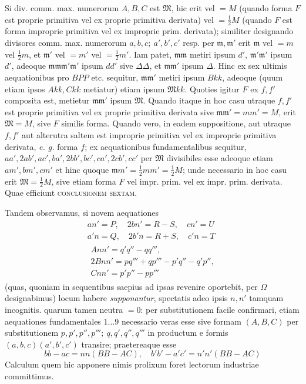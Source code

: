 Si div. comm. max. numerorum $A,B,C$ est $\mathfrak{M}$, hic erit vel $=M$ (quando forma $F$ est proprie primitiva vel ex proprie primitiva derivata) vel $=\frac{1}{2}M$ (quando $F$ est forma improprie primitiva vel ex improprie prim. derivata); similiter designando divisores comm. max. numerorum $a,b,c;\ a',b',c'$ resp. per $\mathfrak{m},\mathfrak{m}'$ erit $\mathfrak{m}$ vel $=m$ vel $\frac{1}{2}m$, et $\mathfrak{m}'$ vel $=m'$ vel $=\frac{1}{2}m'$. Iam patet, $\mathfrak{m}\mathfrak{m}$ metiri ipsum $d'$, $\mathfrak{m}'\mathfrak{m}'$ ipsum $d'$, adeoque $\mathfrak{m}\mathfrak{m}\mathfrak{m}'\mathfrak{m}'$ ipsum $dd'$ sive $\Delta\Delta$, et $\mathfrak{m}\mathfrak{m}'$ ipsum $\Delta$.
Hinc ex sex ultimis aequationibus pro $BPP$ etc. sequitur, $\mathfrak{m}\mathfrak{m}'$ metiri ipsum $Bkk$, adeoque (quum etiam ipsos $Akk,Ckk$ metiatur) etiam ipsum $\mathfrak{M}kk$. Quoties igitur $F$ ex $f,f'$ composita est, metietur $\mathfrak{m}\mathfrak{m}'$ ipsum $\mathfrak{M}$. Quando itaque in hoc casu utraque $f,f'$ est proprie primitiva vel ex proprie primitiva derivata sive $\mathfrak{m}\mathfrak{m}'=mm'=M$, erit $\mathfrak{M}=M$, sive $F$ similis forma. Quando vero, in eadem suppositione, aut utraque $f,f'$ aut alterutra saltem est improprie primitiva vel ex improprie primitiva derivata, \textit{e. g.} forma $f$; ex aequationibus fundamentalibus sequitur, $aa',2ab',ac',ba',2bb',bc',ca',2cb',cc'$ per $\mathfrak{M}$ divisibiles esse adeoque etiam $am',bm',cm'$ et hinc quoque $\mathfrak{m}m'=\frac{1}{2}mm'=\frac{1}{2}M$; unde necessario in hoc casu erit $\mathfrak{M}=\frac{1}{2}M$, sive etiam forma $F$ vel impr. prim. vel ex impr. prim. derivata. Quae efficiunt \textsc{conclusionem sextam}.

Tandem observamus, si novem aequationes
\[
\begin{gathered}
an'=P,\quad 2bn'=R-S,\quad cn'=U\\
a'n=Q,\quad 2b'n=R+S,\quad c'n=T\\
\begin{gathered}Ann'=q'q''-qq''',\\2Bnn'=pq'''+qp'''-p'q''-q'p'',\\Cnn'=p'p''-pp'''\end{gathered}
\end{gathered}
\]
(quas, quoniam in sequentibus saepius ad ipsas revenire oportebit, per $\Omega$ designabimus) locum habere \textit{supponantur}, spectatis adeo ipsis $n,n'$ tamquam incognitis. quarum tamen neutra $=0$: per substitutionem facile confirmari, etiam aequationes fundamentales $1\ldots9$ necessario veras esse sive formam $(A,B,C)$ per substitutionem $p,p',p'',p''';\ q,q',q'',q'''$ in productum e formis $(a,b,c)(a',b',c')$ transire; praetereaque esse
\[
bb-ac=nn(BB-AC),\quad b'b'-a'c'=n'n'(BB-AC)
\]
Calculum quem hic apponere nimis prolixum foret lectorum industriae committimus.

